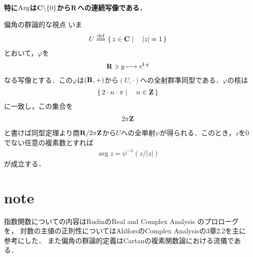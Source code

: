 	{\bf 特に$\operatorname{Arg}$は$\mathbf{C} \backslash \{0\}$から$\mathbf{R}$への連続写像である．}
	
	\begin{itembox}[l]{偏角の群論的な視点}
		いま
		\begin{align}
			U \defeq \Set{z \in \C}{|z| = 1}
		\end{align}
		とおいて，$\varphi$を
		\begin{align}
			\mathbf{R} \ni y \longmapsto e^{\mathbf{i} \cdot y}
		\end{align}
		なる写像とする．この$\varphi$は$(\mathbf{R},+)$から$(U,\cdot)$への全射群準同型である．$\varphi$の核は
		\begin{align}
			\left\{\, 2 \cdot n \cdot \pi \mid \quad n \in \mathbf{Z}\, \right\}
		\end{align}
		に一致し，この集合を
		\begin{align}
			2\pi\mathbf{Z}
		\end{align}
		と書けば同型定理より商$\mathbf{R}/2\pi\mathbf{Z}$から$U$への全単射$\psi$が得られる．このとき，$z$を$0$でない任意の複素数とすれば
		\begin{align}
			\arg{z} = \psi^{-1}(z/|z|)
		\end{align}
		が成立する．
	\end{itembox}
	
\section{note}
	指数関数についての内容はRudinのReal and Complex Analysis のプロローグを，
	対数の主値の正則性についてはAhlforsのComplex Analysisの3章2.2を主に参考にした．
	また偏角の群論的定義はCartanの複素関数論における流儀である．